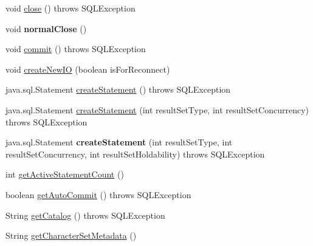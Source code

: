 \begin{DoxyCompactItemize}
\item 
void \mbox{\hyperlink{classcom_1_1mysql_1_1cj_1_1jdbc_1_1_connection_impl_a9d82246a207b618a8ce3dfcf349c971d}{close}} ()  throws S\+Q\+L\+Exception 
\item 
\mbox{\label{classcom_1_1mysql_1_1cj_1_1jdbc_1_1_connection_impl_a4bfd91b48bd990b05482d972c940a53f}} 
void {\bfseries normal\+Close} ()
\item 
void \mbox{\hyperlink{classcom_1_1mysql_1_1cj_1_1jdbc_1_1_connection_impl_ac6218bc1a284e67ff9557bdefc52c388}{commit}} ()  throws S\+Q\+L\+Exception 
\item 
void \mbox{\hyperlink{classcom_1_1mysql_1_1cj_1_1jdbc_1_1_connection_impl_a063addf80134be647765cd125d270968}{create\+New\+IO}} (boolean is\+For\+Reconnect)
\item 
java.\+sql.\+Statement \mbox{\hyperlink{classcom_1_1mysql_1_1cj_1_1jdbc_1_1_connection_impl_ac07000b85a6e8197ac8ca945bc44bbec}{create\+Statement}} ()  throws S\+Q\+L\+Exception 
\item 
java.\+sql.\+Statement \mbox{\hyperlink{classcom_1_1mysql_1_1cj_1_1jdbc_1_1_connection_impl_a0d60b523a6d4c9b50523770c41b9ed3a}{create\+Statement}} (int result\+Set\+Type, int result\+Set\+Concurrency)  throws S\+Q\+L\+Exception 
\item 
\mbox{\label{classcom_1_1mysql_1_1cj_1_1jdbc_1_1_connection_impl_a94c0e54e85d6847d5b567d3ea6f857de}} 
java.\+sql.\+Statement {\bfseries create\+Statement} (int result\+Set\+Type, int result\+Set\+Concurrency, int result\+Set\+Holdability)  throws S\+Q\+L\+Exception 
\item 
int \mbox{\hyperlink{classcom_1_1mysql_1_1cj_1_1jdbc_1_1_connection_impl_a858f89a9745e2ffc3e748c91286d7862}{get\+Active\+Statement\+Count}} ()
\item 
boolean \mbox{\hyperlink{classcom_1_1mysql_1_1cj_1_1jdbc_1_1_connection_impl_a9c1ff3f925f011a393add7da7dae1871}{get\+Auto\+Commit}} ()  throws S\+Q\+L\+Exception 
\item 
String \mbox{\hyperlink{classcom_1_1mysql_1_1cj_1_1jdbc_1_1_connection_impl_a0873bb4479be9327023a37eaace6b45f}{get\+Catalog}} ()  throws S\+Q\+L\+Exception 
\item 
String \mbox{\hyperlink{classcom_1_1mysql_1_1cj_1_1jdbc_1_1_connection_impl_ac1333e56c524a3b5436c575ee82b0c18}{get\+Character\+Set\+Metadata}} ()
\item 

\end{DoxyCompactItemize}
